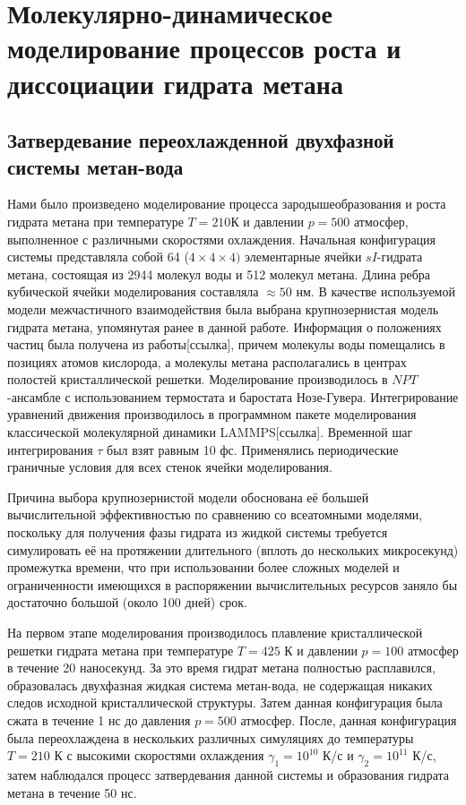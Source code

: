 \chapter{Молекулярно-динамическое моделирование процессов роста и диссоциации гидрата метана}
\section{Затвердевание переохлажденной двухфазной системы метан-вода}
Нами было произведено моделирование процесса зародышеобразования и роста гидрата метана при температуре $T=210$К и давлении $p=500$ атмосфер, выполненное с различными скоростями охлаждения. Начальная конфигурация системы представляла собой 64 ($4\times 4\times 4)$ элементарные ячейки $sI$-гидрата метана, состоящая из 2944 молекул воды и 512 молекул метана. Длина ребра кубической ячейки моделирования составляла $\approx 50$ нм. В качестве используемой модели межчастичного взаимодействия была выбрана крупнозернистая модель гидрата метана, упомянутая ранее в данной работе. Информация о положениях частиц была получена из работы[ссылка], причем молекулы воды помещались в позициях атомов кислорода, а молекулы метана располагались в центрах полостей кристаллической решетки. Моделирование производилось в $NPT$-ансамбле с использованием термостата и баростата Нозе-Гувера. Интегрирование уравнений движения производилось в программном пакете моделирования классической молекулярной динамики LAMMPS[ссылка]. Временной шаг интегрирования $\tau$ был взят равным 10 фс. Применялись периодические граничные условия для всех стенок ячейки моделирования.

Причина выбора крупнозернистой модели обоснована её большей вычислительной эффективностью по сравнению со всеатомными моделями, поскольку для получения фазы гидрата из жидкой системы требуется симулировать её на протяжении длительного (вплоть до нескольких микросекунд) промежутка времени, что при использовании более сложных моделей и ограниченности имеющихся в распоряжении вычислительных ресурсов заняло бы достаточно большой (около 100 дней) срок.

На первом этапе моделирования производилось плавление кристаллической решетки гидрата метана при температуре $T=425$ К и давлении $p=100$ атмосфер в течение 20 наносекунд. За это время гидрат метана полностью расплавился, образовалась двухфазная жидкая система метан-вода, не содержащая никаких следов исходной кристаллической структуры. Затем данная конфигурация была сжата в течение 1 нс до давления $p=500$ атмосфер. После, данная конфигурация была переохлаждена в нескольких различных симуляциях до температуры $T=210$ К с высокими скоростями охлаждения $\gamma_1=10^{10}$ К/с и $\gamma_2=10^{11}$ К/с, затем наблюдался процесс затвердевания данной системы и образования гидрата метана в течение 50 нс.

